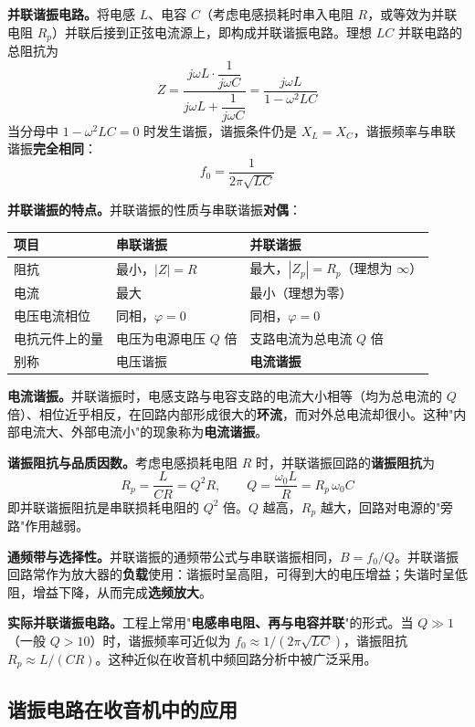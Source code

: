 \documentclass[12pt,UTF8]{ctexbook}
\begin{document}
\textbf{并联谐振电路。}将电感 $L$、电容 $C$（考虑电感损耗时串入电阻 $R$，或等效为并联电阻 $R_p$）并联后接到正弦电流源上，即构成并联谐振电路。理想 $LC$ 并联电路的总阻抗为
\[
Z = \frac{j\omega L \cdot \dfrac{1}{j\omega C}}{j\omega L + \dfrac{1}{j\omega C}} = \frac{j\omega L}{1-\omega^2 LC}
\]
当分母中 $1-\omega^2 LC=0$ 时发生谐振，谐振条件仍是 $X_L=X_C$，谐振频率与串联谐振\textbf{完全相同}：
\[
f_0 = \frac{1}{2\pi\sqrt{LC}}
\]

\textbf{并联谐振的特点。}并联谐振的性质与串联谐振\textbf{对偶}：

\begin{center}
\begin{tabular}{lll}
\hline
\textbf{项目} & \textbf{串联谐振} & \textbf{并联谐振} \\
\hline
阻抗 & 最小，$|Z|=R$ & 最大，$|Z_p|=R_p$（理想为 $\infty$） \\
电流 & 最大 & 最小（理想为零） \\
电压电流相位 & 同相，$\varphi=0$ & 同相，$\varphi=0$ \\
电抗元件上的量 & 电压为电源电压 $Q$ 倍 & 支路电流为总电流 $Q$ 倍 \\
别称 & 电压谐振 & \textbf{电流谐振} \\
\hline
\end{tabular}
\end{center}

\textbf{电流谐振。}并联谐振时，电感支路与电容支路的电流大小相等（均为总电流的 $Q$ 倍）、相位近乎相反，在回路内部形成很大的\textbf{环流}，而对外总电流却很小。这种"内部电流大、外部电流小"的现象称为\textbf{电流谐振}。

\textbf{谐振阻抗与品质因数。}考虑电感损耗电阻 $R$ 时，并联谐振回路的\textbf{谐振阻抗}为
\[
R_p = \frac{L}{CR} = Q^2 R, \qquad Q = \frac{\omega_0 L}{R} = R_p\,\omega_0 C
\]
即并联谐振阻抗是串联损耗电阻的 $Q^2$ 倍。$Q$ 越高，$R_p$ 越大，回路对电源的"旁路"作用越弱。

\textbf{通频带与选择性。}并联谐振的通频带公式与串联谐振相同，$B=f_0/Q$。并联谐振回路常作为放大器的\textbf{负载}使用：谐振时呈高阻，可得到大的电压增益；失谐时呈低阻，增益下降，从而完成\textbf{选频放大}。

\textbf{实际并联谐振电路。}工程上常用"\textbf{电感串电阻、再与电容并联}"的形式。当 $Q\gg 1$（一般 $Q>10$）时，谐振频率可近似为 $f_0\approx 1/(2\pi\sqrt{LC})$，谐振阻抗 $R_p\approx L/(CR)$。这种近似在收音机中频回路分析中被广泛采用。

\subsection{谐振电路在收音机中的应用}
\end{document}
